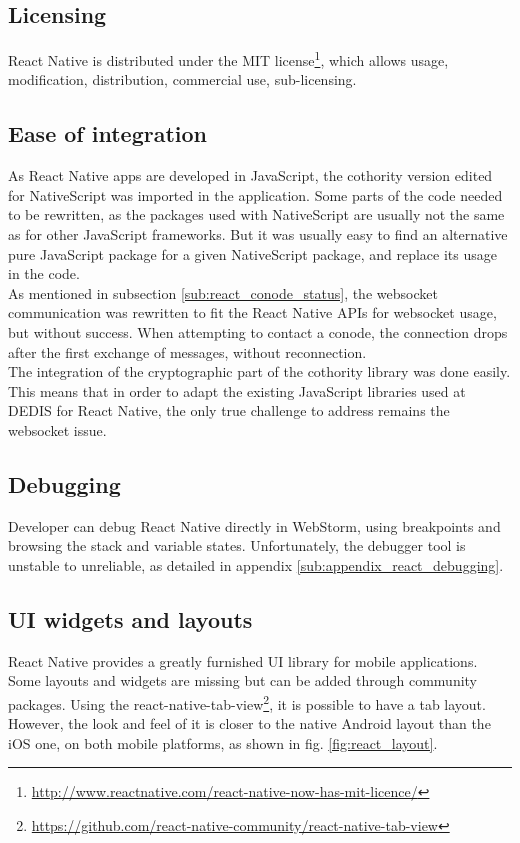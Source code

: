 \documentclass[11pt, a4paper, twoside, openright]{article} %
\begin{document}
{\subsection{Licensing}
React Native is distributed under the MIT license\footnote{\url{http://www.reactnative.com/react-native-now-has-mit-licence/}}, which allows usage, modification, distribution, commercial use, sub-licensing.

\subsection{Ease of integration}
As React Native apps are developed in JavaScript, the cothority version edited for NativeScript was imported in the application. Some parts of the code needed to be rewritten, as the packages used with NativeScript are usually not the same as for other JavaScript frameworks. But it was usually easy to find an alternative pure JavaScript package for a given NativeScript package, and replace its usage in the code.\\
As mentioned in subsection \ref{sub:react_conode_status}, the websocket communication was rewritten to fit the React Native APIs for websocket usage, but without success. When attempting to contact a conode, the connection drops after the first exchange of messages, without reconnection.\\
The integration of the cryptographic part of the cothority library was done easily. This means that in order to adapt the existing JavaScript libraries used at DEDIS for React Native, the only true challenge to address remains the websocket issue. 


\subsection{Debugging}
\label{sub:react_debug}
Developer can debug React Native directly in WebStorm, using breakpoints and browsing the stack and variable states. Unfortunately, the debugger tool is unstable to unreliable, as detailed in appendix \ref{sub:appendix_react_debugging}.

\subsection{UI widgets and layouts}
React Native provides a greatly furnished UI library for mobile applications. Some layouts and widgets are missing but can be added through community packages.
Using the react-native-tab-view\footnote{\url{https://github.com/react-native-community/react-native-tab-view}}, it is possible to have a tab layout. However, the look and feel of it is closer to the native Android layout than the iOS one, on both mobile platforms, as shown in fig. \ref{fig:react_layout}.

}
\end{document}
